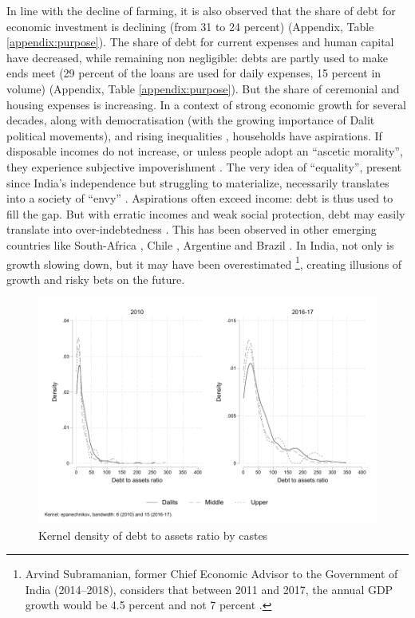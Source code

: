 \documentclass[a4paper, 11pt, onecolumn]{article}
\begin{document}
In line with the decline of farming, it is also observed that the share of debt for economic investment is declining (from 31 to 24 percent) (Appendix, Table \ref{appendix:purpose}). 
The share of debt for current expenses and human capital have decreased, while remaining non negligible: debts are partly used to make ends meet (29 percent of the loans are used for daily expenses, 15 percent in volume) (Appendix, Table \ref{appendix:purpose}). 
But the share of ceremonial and housing expenses is increasing. 
In a context of strong economic growth for several decades, along with democratisation (with the growing importance of Dalit political movements), and rising inequalities \citep{Chancel2019}, households have aspirations. 
If disposable incomes do not increase, or unless people adopt an ``ascetic morality'', they experience subjective impoverishment \citep[p.33]{Servet2013}. The very idea of ``equality'', present since India's independence but struggling to materialize, necessarily translates into a society of ``envy'' \citep{Dupuy2014}. 
Aspirations often exceed income: debt is thus used to fill the gap. 
But with erratic incomes and weak social protection, debt may easily translate into over-indebtedness \citep{Servet2013}. 
This has been observed in other emerging countries like South-Africa \citep{James2015}, Chile \citep{Han2012, Gonzalez2015}, Argentine \citep{Saiag2020} and Brazil \citep{Lavinas2017}. 
In India, not only is growth slowing down, but it may have been overestimated \citep{Subramanian2019}\footnote{Arvind Subramanian, former Chief Economic Advisor to the Government of India (2014–2018), considers that between 2011 and 2017, the annual GDP growth would be 4.5 percent and not 7 percent \citep{Subramanian2019}.}, creating illusions of growth and risky bets on the future. 

\begin{figure}[h!]
\center
\includegraphics[width=12cm]{DAR_caste.pdf}
\caption{Kernel density of debt to assets ratio by castes}
\label{kernel:DARcastes}
\end{figure}
\end{document}
